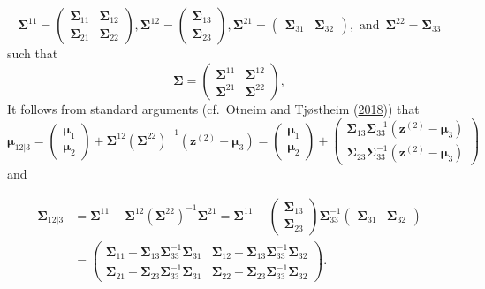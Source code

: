 \documentclass[
  12pt,
  letterpaper]{article}
\numberwithin{equation}{section}
\newcommand{\ztwo}{\bm{z}^{(2)}}
\newcommand{\fmu}{\bm{\mu}}
\newcommand{\fSigma}{\bm{\Sigma}}
\begin{document}
\[\fSigma^{11} = \begin{pmatrix} \fSigma_{11} & \fSigma_{12} \\ \fSigma_{21} & \fSigma_{22}\end{pmatrix}, \fSigma^{12} = \begin{pmatrix} \fSigma_{13} \\ \fSigma_{23}\end{pmatrix}, \fSigma^{21} = \begin{pmatrix} \fSigma_{31} & \fSigma_{32}\end{pmatrix}, \textrm{ and } \, \fSigma^{22} = \fSigma_{33}\]
such that
\[\fSigma = \begin{pmatrix} \fSigma^{11} & \fSigma^{12} \\ \fSigma^{21} & \fSigma^{22}\end{pmatrix},\]
It follows from standard arguments (cf.~Otneim and Tjøstheim (\protect\hyperlink{ref-otneim2017conditional}{2018})) that
\begin{equation}
\fmu_{12|3} = \begin{pmatrix} \fmu_1 \\ \fmu_2 \end{pmatrix} + \fSigma^{12}\left(\fSigma^{22}\right)^{-1}\left(\ztwo - \fmu_3\right) = \begin{pmatrix} \fmu_1 \\ \fmu_2 \end{pmatrix} + \begin{pmatrix} \fSigma_{13}\fSigma_{33}^{-1} \left(\ztwo - \fmu_3\right) \\  \fSigma_{23}\fSigma_{33}^{-1} \left(\ztwo - \fmu_3\right)\end{pmatrix}
\end{equation}
and

\begin{align}
\fSigma_{12|3} &= \fSigma^{11} - \fSigma^{12}\left(\fSigma^{22}\right)^{-1}\fSigma^{21} = \fSigma^{11} - \begin{pmatrix} \fSigma_{13} \\ \fSigma_{23} \end{pmatrix} \fSigma_{33}^{-1} \begin{pmatrix} \fSigma_{31} & \fSigma_{32} \end{pmatrix}\nonumber \\
&= \begin{pmatrix} \fSigma_{11} - \fSigma_{13}\fSigma_{33}^{-1} \fSigma_{31} & \fSigma_{12} - \fSigma_{13}\fSigma_{33}^{-1} \fSigma_{32} \\ \fSigma_{21} - \fSigma_{23}\fSigma_{33}^{-1} \fSigma_{31} & \fSigma_{22} - \fSigma_{23}\fSigma_{33}^{-1} \fSigma_{32}\end{pmatrix}. 
\label{eq:blocksigma}
\end{align}
\end{document}
